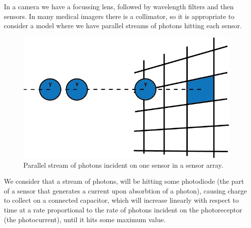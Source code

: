 \documentclass[12pt,twoside,notitlepage]{report}
\begin{document}
        In a camera we have a focussing lens, followed by wavelength filters and then sensors. In many medical imagers 
        there is a collimator, so it is appropriate to consider a model where we have parallel streams of photons 
        hitting each sensor.

        \begin{figure}[H]
            \centering
            \includegraphics[scale=0.5]{photon_stream}
            \caption{Parallel stream of photons incident on one sensor in a sensor array.}
            \label{fig:photon_stream}
        \end{figure}

        We consider that a stream of photons, will be hitting some photodiode (the 
        part of a sensor that generates a current upon absorbtion of a photon), causing charge to collect on a connected 
        capacitor, which will increase linearly with respect to time at a rate proportional to the rate of photons 
        incident on the photoreceptor (the photocurrent), until it hits some maximum value. \cite{gamal2005cmos}
\end{document}
